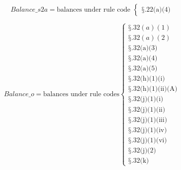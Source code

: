 \documentclass{article}
\begin{document}
\[ 
    Balance\_{s2a}  = \text{balances under rule code }
    \begin{cases}
        \text{§.22(a)(4)}
    \end{cases}
\]

\[ 
    Balance\_o = \text{balances under rule codes}
    \begin{cases}
        \text{§}.32(a)(1) \\
        \text{§}.32(a)(2) \\
        \text{§.32(a)(3)} \\
        \text{§.32(a)(4)} \\
        \text{§.32(a)(5)} \\
        \text{§.32(h)(1)(i)} \\
        \text{§.32(h)(1)(ii)(A)} \\
        \text{§.32(j)(1)(i)} \\
        \text{§.32(j)(1)(ii)} \\
        \text{§.32(j)(1)(iii)} \\
        \text{§.32(j)(1)(iv)} \\
        \text{§.32(j)(1)(vi)} \\
        \text{§.32(j)(2)} \\
        \text{§.32(k)} 
    \end{cases}
\]
\end{document}
